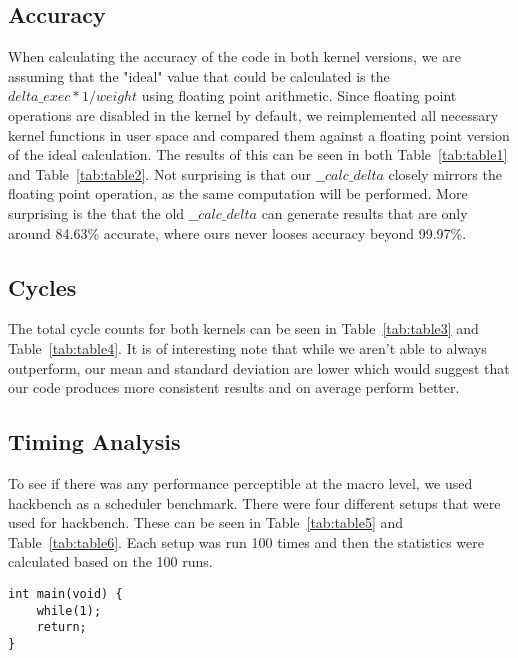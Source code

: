 \documentclass[10pt, conference]{IEEEtran}
\begin{document}
\subsection{Accuracy}
When calculating the accuracy of the code in both kernel versions, we are assuming that the "ideal" value that could be calculated is the $delta\_exec * 1 / weight$ using floating point arithmetic. Since floating point operations are disabled in the kernel by default, we reimplemented all necessary kernel functions in user space and compared them against a floating point version of the ideal calculation. The results of this can be seen in both Table~\ref{tab:table1} and Table~\ref{tab:table2}. Not surprising is that our  $\_\_calc\_delta$ closely mirrors the floating point operation, as the same computation will be performed. More surprising is the that the old  $\_\_calc\_delta$ can generate results that are only around 84.63\% accurate, where ours never looses accuracy beyond 99.97\%.

\subsection{Cycles}
The total cycle counts for both kernels can be seen in Table~\ref{tab:table3} and Table~\ref{tab:table4}. It is of interesting note that while we aren't able to always outperform, our mean and standard deviation are lower which would suggest that our code produces more consistent results and on average perform better.

\subsection{Timing Analysis}
To see if there was any performance perceptible at the macro level, we used hackbench as a scheduler benchmark. There were four different setups that were used for hackbench. These can be seen in Table~\ref{tab:table5} and Table~\ref{tab:table6}. Each setup was run 100 times and then the statistics were calculated based on the 100 runs.

\begin{lstlisting}
int main(void) {
	while(1);
	return;
}
\end{lstlisting}
 \label{lst:listing3}

    \begin{center}
	 \label{tab:table1}
\end{center}
\end{document}
